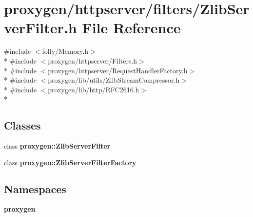 \section{proxygen/httpserver/filters/\+Zlib\+Server\+Filter.h File Reference}
\label{ZlibServerFilter_8h}
{\ttfamily \#include $<$folly/\+Memory.\+h$>$}\\*
{\ttfamily \#include $<$proxygen/httpserver/\+Filters.\+h$>$}\\*
{\ttfamily \#include $<$proxygen/httpserver/\+Request\+Handler\+Factory.\+h$>$}\\*
{\ttfamily \#include $<$proxygen/lib/utils/\+Zlib\+Stream\+Compressor.\+h$>$}\\*
{\ttfamily \#include $<$proxygen/lib/http/\+R\+F\+C2616.\+h$>$}\\*
\subsection*{Classes}
\begin{DoxyCompactItemize}
\item 
class {\bf proxygen\+::\+Zlib\+Server\+Filter}
\item 
class {\bf proxygen\+::\+Zlib\+Server\+Filter\+Factory}
\end{DoxyCompactItemize}
\subsection*{Namespaces}
\begin{DoxyCompactItemize}
\item 
 {\bf proxygen}
\end{DoxyCompactItemize}
